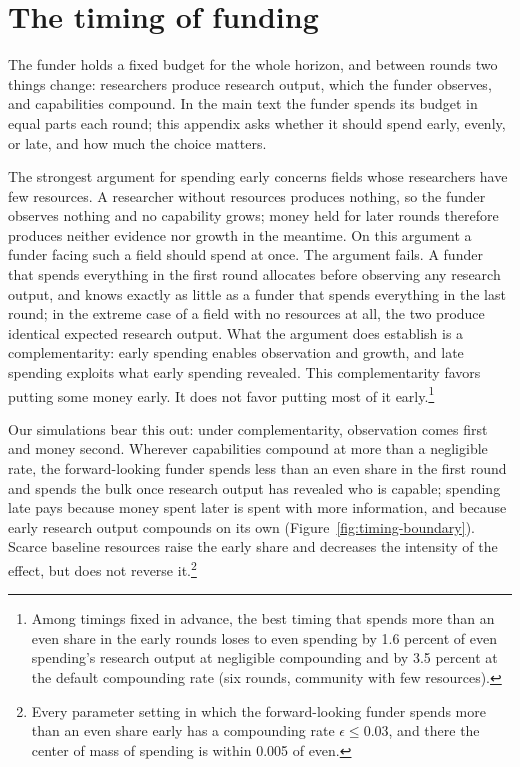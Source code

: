 \section{The timing of funding}\label{app:timing}

The funder holds a fixed budget for the whole horizon, and between rounds two things change: researchers produce research output, which the funder observes, and capabilities compound. In the main text the funder spends its budget in equal parts each round; this appendix asks whether it should spend early, evenly, or late, and how much the choice matters.

The strongest argument for spending early concerns fields whose researchers have few resources. A researcher without resources produces nothing, so the funder observes nothing and no capability grows; money held for later rounds therefore produces neither evidence nor growth in the meantime. On this argument a funder facing such a field should spend at once. The argument fails. A funder that spends everything in the first round allocates before observing any research output, and knows exactly as little as a funder that spends everything in the last round; in the extreme case of a field with no resources at all, the two produce identical expected research output. What the argument does establish is a complementarity: early spending enables observation and growth, and late spending exploits what early spending revealed. This complementarity favors putting some money early. It does not favor putting most of it early.\footnote{Among timings fixed in advance, the best timing that spends more than an even share in the early rounds loses to even spending by 1.6 percent of even spending's research output at negligible compounding and by 3.5 percent at the default compounding rate (six rounds, community with few resources).}

Our simulations bear this out: under complementarity, observation comes first and money second. Wherever capabilities compound at more than a negligible rate, the forward-looking funder spends less than an even share in the first round and spends the bulk once research output has revealed who is capable; spending late pays because money spent later is spent with more information, and because early research output compounds on its own (Figure~\ref{fig:timing-boundary}). Scarce baseline resources raise the early share and decreases the intensity of the effect, but does not reverse it.\footnote{Every parameter setting in which the forward-looking funder spends more than an even share early has a compounding rate $\epsilon \leq 0.03$, and there the center of mass of spending is within 0.005 of even.}

